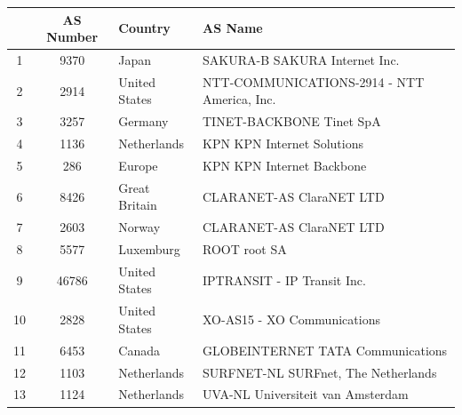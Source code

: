 \documentclass[12pt]{article}
\begin{document}
\begin{enumerate}
\begin{tabular}{| c || c | l | p{6cm} |}
            \hline
            \cellcolor{gray!40} & \cellcolor{gray!40} AS Number & \cellcolor{gray!40} Country & \cellcolor{gray!40} AS Name \\
            \hline
            1 & 9370 & Japan & SAKURA-B SAKURA Internet Inc. \\
            \hline
            2 & 2914 &United States &NTT-COMMUNICATIONS-2914 - \newline
            NTT America, Inc. \\
            \hline
            3 & 3257 &Germany &TINET-BACKBONE Tinet SpA \\
            \hline
            4 & 1136 & Netherlands &KPN KPN Internet Solutions \\
            \hline
            5 & 286 & Europe & KPN KPN Internet Backbone \\
            \hline
            6 & 8426 & Great Britain & CLARANET-AS ClaraNET LTD \\
            \hline
            7 & 2603 & Norway & CLARANET-AS ClaraNET LTD \\
            \hline
            8 & 5577 & Luxemburg & ROOT root SA \\
            \hline
            9 & 46786 & United States & IPTRANSIT - IP Transit Inc. \\
            \hline
            10 & 2828 & United States & XO-AS15 - XO Communications \\
            \hline
            11 & 6453 & Canada & GLOBEINTERNET TATA Communications \\
            \hline
            12 & 1103 & Netherlands & SURFNET-NL SURFnet, The Netherlands \\
            \hline
            13 & 1124 & Netherlands &UVA-NL Universiteit van Amsterdam \\
            \hline
        \end{tabular}
\end{enumerate}
\end{document}

